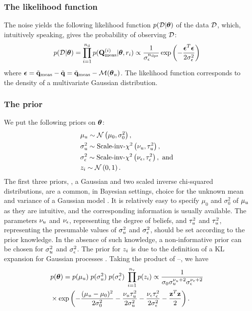 \subsubsection{The likelihood function}
The noise yields the following likelihood function $\f{\Data | \vparam}$ of the data $\mathcal{D}$, which, intuitively speaking, gives the probability of observing $\mathcal{D}$:
\begin{equation} \elabel{likelihood}
  \f{\Data | \vparam} = \prod_{i = 1}^{\ndata} \f{\mT^{(i)}_\meas| \vparam, \r_i} \propto \frac{1}{\sigma_\noise^\ndcs} \exp\left( -\frac{\vnoise^T \vnoise}{2 \sigma^2_\noise} \right)
\end{equation}
where $\vnoise = \mvT_\meas - \mvT = \mvT_\meas - \model{\vparam_\u}$. The likelihood function corresponds to the density of a multivariate Gaussian distribution.

\subsubsection{The prior}
We put the following priors on ${\boldsymbol\theta}$:
\begin{align}
  & \mu_\u \sim \gaussian{\mu_0}{\sigma^2_0}, \elabel{mu-u-prior} \\
  & \sigma^2_\u \sim \sichisquared{\nu_\u}{\tau^2_\u}, \elabel{sigma2-u-prior} \\
  & \sigma^2_\noise \sim \sichisquared{\nu_\noise}{\tau^2_\noise}, \text{ and} \elabel{sigma2-noise-prior} \\
  & \z_i \sim \gaussian{0}{1}. \elabel{z-prior}
\end{align}
The first three priors, \ie, a Gaussian and two scaled inverse chi-squared distributions, are a common, in Bayesian settings, choice for the unknown mean and variance of a Gaussian model \cite{gelman2004}. It is relatively easy to specify $\mu_0$ and $\sigma^2_0$ of $\mu_u$ as they are intuitive, and the corresponding information is usually available. The parameters $\nu_u$ and $\nu_\epsilon$, representing the degree of beliefs, and $\tau^2_u$ and $\tau^2_u$, representing the presumable values of $\sigma^2_u$ and $\sigma^2_\epsilon$, should be set according to the prior knowledge. In the absence of such knowledge, a non-informative prior can be chosen for $\sigma^2_u$ and $\sigma^2_\epsilon$. The prior for $z_i$ is due to the definition of a KL expansion for Gaussian processes \cite{marzouk2009}. Taking the product of --, we have
\begin{align}
  & \f{\vparam} = \f{\mu_\u} \; \f{\sigma^2_\u} \; \f{\sigma^2_\noise} \; \prod_{i = 1}^\nvars \f{\z_i} \propto \frac{1}{\sigma_0 \sigma_\u^{\nu_\u + 2} \sigma_\noise^{\nu_\noise + 2}} \nonumber \\
  & \times \exp\left( -\frac{(\mu_\u - \mu_0)^2}{2 \sigma^2_0} - \frac{\nu_\u \tau_\u^2}{2 \sigma^2_\u} - \frac{\nu_\noise \tau_\noise^2}{2 \sigma^2_\noise} - \frac{\vz^T\vz}{2} \right). \elabel{prior}
\end{align}

